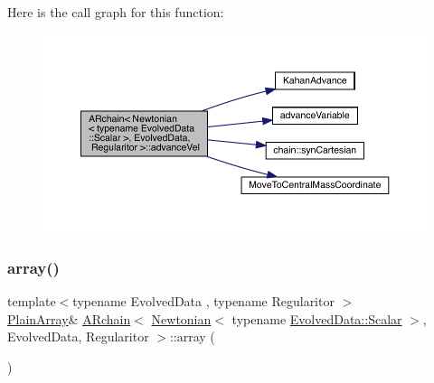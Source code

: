 Here is the call graph for this function\+:
\nopagebreak
\begin{figure}[H]
\begin{center}
\leavevmode
\includegraphics[width=350pt]{class_a_rchain_3_01_newtonian_3_01typename_01_evolved_data_1_1_scalar_01_4_00_01_evolved_data_00_01_regularitor_01_4_ad11d21617228157e755aa334d9c621a7_cgraph}
\end{center}
\end{figure}
\mbox{\label{class_a_rchain_3_01_newtonian_3_01typename_01_evolved_data_1_1_scalar_01_4_00_01_evolved_data_00_01_regularitor_01_4_a919d200a913f75719c7240c030b9b113}} 
\subsubsection{\texorpdfstring{array()}{array()}}
{\footnotesize\ttfamily template$<$typename Evolved\+Data , typename Regularitor $>$ \\
\mbox{\hyperlink{class_a_rchain_3_01_newtonian_3_01typename_01_evolved_data_1_1_scalar_01_4_00_01_evolved_data_00_01_regularitor_01_4_a8cf940df8dabb6c78662f839c2b13c9a}{Plain\+Array}}\& \mbox{\hyperlink{class_a_rchain}{A\+Rchain}}$<$ \mbox{\hyperlink{class_newtonian}{Newtonian}}$<$ typename \mbox{\hyperlink{class_a_rchain_a707e42a79e4744424a34c9007e84ee07}{Evolved\+Data\+::\+Scalar}} $>$, Evolved\+Data, Regularitor $>$\+::array (\begin{DoxyParamCaption}{ }\end{DoxyParamCaption})\hspace{0.3cm}{\ttfamily [inline]}}

